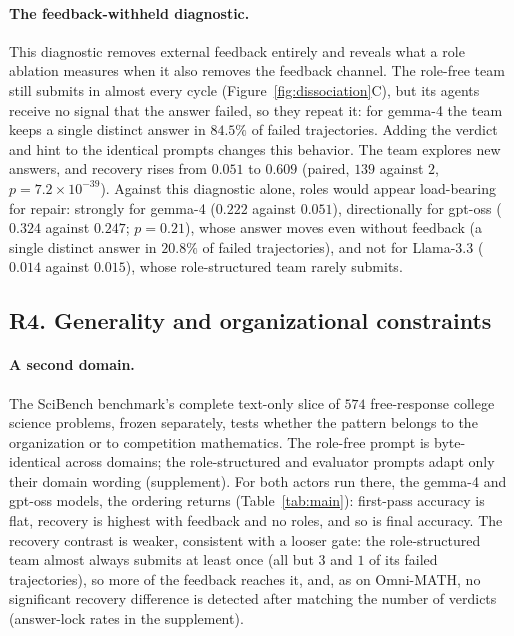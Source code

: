 \paragraph{The feedback-withheld diagnostic.} This diagnostic removes
external feedback entirely and reveals what a role ablation measures when
it also removes the feedback channel. The role-free team still submits in
almost every cycle (Figure~\ref{fig:dissociation}C), but its agents receive
no signal that the answer failed, so they repeat it: for gemma-4 the team
keeps a single distinct answer in $84.5\%$ of failed trajectories. Adding
the verdict and hint to the identical prompts changes this behavior. The
team explores new answers, and recovery rises from $0.051$ to $0.609$
(paired, $139$ against $2$, $p=7.2\times10^{-39}$). Against this diagnostic
alone, roles would appear load-bearing for repair: strongly for gemma-4
($0.222$ against $0.051$), directionally for gpt-oss ($0.324$ against
$0.247$; $p=0.21$), whose answer moves even without feedback (a single
distinct answer in $20.8\%$ of failed trajectories), and not for Llama-3.3
($0.014$ against $0.015$), whose role-structured team rarely submits.

\subsection{R4. Generality and organizational constraints}
\label{subsec:xdomain}

\paragraph{A second domain.} The SciBench benchmark's complete text-only slice of $574$ free-response
college science problems, frozen separately, tests whether the pattern
belongs to the organization or to competition mathematics. The role-free
prompt is byte-identical across domains; the role-structured and evaluator
prompts adapt only their domain wording (supplement). For both actors run
there, the gemma-4 and gpt-oss models, the ordering returns
(Table~\ref{tab:main}): first-pass accuracy is flat, recovery is highest
with feedback and no roles, and so is final accuracy. The
recovery contrast is weaker, consistent with a looser gate: the
role-structured team almost always submits at least once (all but $3$ and
$1$ of its failed trajectories), so more of the feedback reaches it, and,
as on Omni-MATH, no significant recovery difference is detected after
matching the number of verdicts (answer-lock rates in the supplement).

